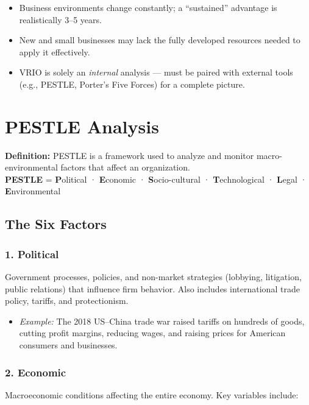 \documentclass[11pt, letterpaper]{article}
\begin{document}
\begin{itemize}[leftmargin=*]
  \item Business environments change constantly; a ``sustained'' advantage is realistically 3--5 years.
  \item New and small businesses may lack the fully developed resources needed to apply it effectively.
  \item VRIO is solely an \textit{internal} analysis --- must be paired with external tools (e.g., PESTLE, Porter's Five Forces) for a complete picture.
\end{itemize}

\newpage

\section{PESTLE Analysis}

\begin{defbox}
\textbf{Definition:} PESTLE is a framework used to analyze and monitor macro-environmental factors that affect an organization.\\[0.4em]
\textbf{PESTLE} = \textbf{P}olitical · \textbf{E}conomic · \textbf{S}ocio-cultural · \textbf{T}echnological · \textbf{L}egal · \textbf{E}nvironmental
\end{defbox}

\subsection{The Six Factors}

\subsubsection{1. Political}
Government processes, policies, and non-market strategies (lobbying, litigation, public relations) that influence firm behavior. Also includes international trade policy, tariffs, and protectionism.

\begin{itemize}[leftmargin=*]
  \item \textit{Example:} The 2018 US--China trade war raised tariffs on hundreds of goods, cutting profit margins, reducing wages, and raising prices for American consumers and businesses.
\end{itemize}

\subsubsection{2. Economic}
Macroeconomic conditions affecting the entire economy. Key variables include:
\end{document}

